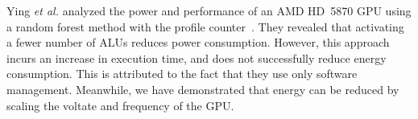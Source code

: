 Ying \textit{et al.} analyzed the power and performance of an AMD
HD~5870 GPU using a random forest method with the profile
counter~\cite{ying2011}.
They revealed that activating a fewer number of ALUs reduces power
consumption.
However, this approach incurs an increase in execution time, and does
not successfully reduce energy consumption.
This is attributed to the fact that they use only software management.
Meanwhile, we have demonstrated that energy can be reduced by scaling
the voltate and frequency of the GPU.
